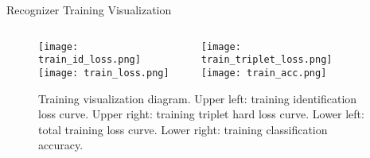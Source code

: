 \begin{frame}{Recognizer Training Visualization}
    \begin{figure}
    \begin{columns}
        \begin{column}{0.4\textwidth}
            \centering
            \texttt{[image: train\_id\_loss.png]}\\
            \texttt{[image: train\_loss.png]}
        \end{column}        
        \begin{column}{0.4\textwidth}
            \centering
            \texttt{[image: train\_triplet\_loss.png]}\\
            \texttt{[image: train\_acc.png]}
        \end{column}
    \end{columns}
    \caption
    {Training visualization diagram. Upper left: training identification 
        loss curve. Upper right: training triplet hard loss curve. Lower 
        left: total training loss curve. Lower right: training 
        classification accuracy.}
    \end{figure}
\end{frame}












































